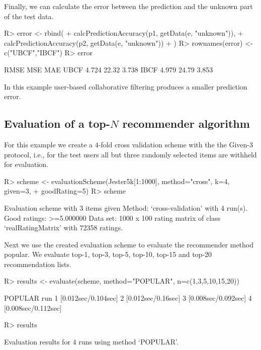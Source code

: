 \documentclass[nojss]{jss}
\begin{document}
Finally, we can calculate the error between the prediction and the
unknown part of the test data.

\begin{Schunk}
\begin{Sinput}
R> error <- rbind(
+   calcPredictionAccuracy(p1, getData(e, "unknown")),
+   calcPredictionAccuracy(p2, getData(e, "unknown"))
+ )
R> rownames(error) <- c("UBCF","IBCF")
R> error
\end{Sinput}
\begin{Soutput}
      RMSE   MSE   MAE
UBCF 4.724 22.32 3.738
IBCF 4.979 24.79 3.853
\end{Soutput}
\end{Schunk}

In this example user-based collaborative filtering produces a smaller 
prediction error.

\subsection{Evaluation of a top-$N$ recommender algorithm}

For this example we create a $4$-fold cross validation scheme 
with the the Given-3 protocol, i.e.,
for the test users all but three randomly selected items are withheld 
for evaluation.

\begin{Schunk}
\begin{Sinput}
R> scheme <- evaluationScheme(Jester5k[1:1000], method="cross", k=4, given=3,
+     goodRating=5)
R> scheme
\end{Sinput}
\begin{Soutput}
Evaluation scheme with 3 items given
Method: ‘cross-validation’ with 4 run(s).
Good ratings: >=5.000000
Data set: 1000 x 100 rating matrix of class ‘realRatingMatrix’ with 72358 ratings.
\end{Soutput}
\end{Schunk}

Next we use the created evaluation scheme to evaluate the recommender 
method popular.
We evaluate top-1, top-3, top-5, top-10, top-15 and top-20 recommendation lists.

\begin{Schunk}
\begin{Sinput}
R> results <- evaluate(scheme, method="POPULAR", n=c(1,3,5,10,15,20))
\end{Sinput}
\begin{Soutput}
POPULAR run 
	 1  [0.012sec/0.104sec] 
	 2  [0.012sec/0.16sec] 
	 3  [0.008sec/0.092sec] 
	 4  [0.008sec/0.112sec] 
\end{Soutput}
\begin{Sinput}
R> results
\end{Sinput}
\begin{Soutput}
Evaluation results for 4 runs using method ‘POPULAR’.
\end{Soutput}
\end{Schunk}
\end{document}
